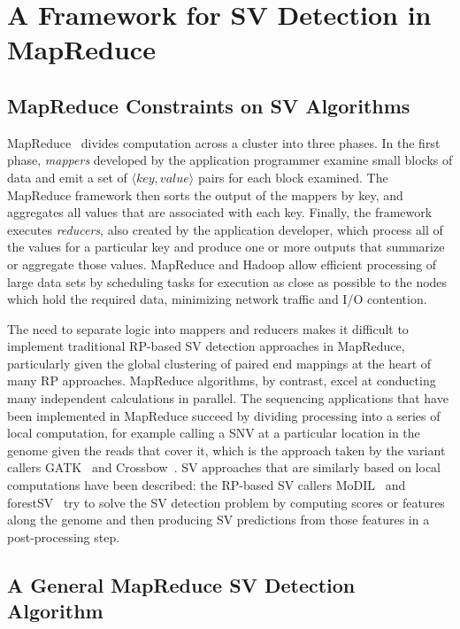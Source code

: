 \chapter{A Framework for SV Detection in MapReduce}\label{chap_framework}

\section{MapReduce Constraints on SV Algorithms}

MapReduce~\cite{Dean:2008p277} divides computation across a cluster into three phases. In the first phase, \emph{mappers} developed by the application programmer examine small blocks of data and emit a set of $\langle key, value \rangle$ pairs for each block examined. The MapReduce framework then sorts the output of the mappers by key, and aggregates all values that are associated with each key. Finally, the framework executes \emph{reducers}, also created by the application developer, which process all of the values for a particular key and produce one or more outputs that summarize or aggregate those values. MapReduce and Hadoop allow efficient processing of large data sets by scheduling tasks for execution as close as possible to the nodes which hold the required data, minimizing network traffic and I/O contention.

The need to separate logic into mappers and reducers makes it difficult to implement traditional RP-based SV detection approaches in MapReduce, particularly given the global clustering of paired end mappings at the heart of many RP approaches. MapReduce algorithms, by contrast, excel at conducting many independent calculations in parallel. The sequencing applications that have been implemented in MapReduce succeed by dividing processing into a series of local computation, for example calling a SNV at a particular location in the genome given the reads that cover it, which is the approach taken by the variant callers GATK~\cite{McKenna:2010p1051} and Crossbow~\cite{Langmead:2009p1225}. SV approaches that are similarly based on local computations have been described: the RP-based SV callers MoDIL~\cite{Lee:2009da} and forestSV~\cite{Michaelson:2012fj} try to solve the SV detection problem by computing scores or features along the genome and then producing SV predictions from those features in a post-processing step. 

\section{A General MapReduce SV Detection Algorithm}\label{section_general_algo}

